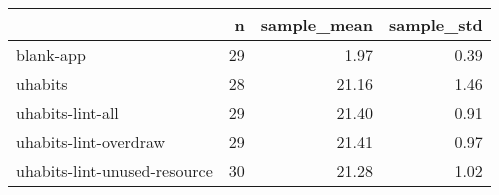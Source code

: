 \begin{tabular}{lrrr}
\toprule
{} &   n &  sample\_mean &  sample\_std \\
\midrule
blank-app                    &  29 &         1.97 &        0.39 \\
uhabits                      &  28 &        21.16 &        1.46 \\
uhabits-lint-all             &  29 &        21.40 &        0.91 \\
uhabits-lint-overdraw        &  29 &        21.41 &        0.97 \\
uhabits-lint-unused-resource &  30 &        21.28 &        1.02 \\
\bottomrule
\end{tabular}
